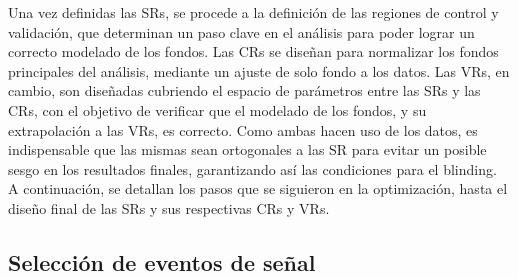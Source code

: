 Una vez definidas las SRs, se procede a la definición de las regiones de control y validación, que determinan un paso clave en el análisis para poder lograr un correcto modelado de los fondos. Las CRs se diseñan para normalizar los fondos principales del análisis, mediante un ajuste de solo fondo a los datos. Las VRs, en cambio, son diseñadas cubriendo el espacio de parámetros entre las SRs y las CRs, con el objetivo de verificar que el modelado de los fondos, y su extrapolación a las VRs, es correcto. Como ambas hacen uso de los datos, es indispensable que las mismas sean ortogonales a las SR para evitar un posible sesgo en los resultados finales, garantizando así las condiciones para el blinding.
A continuación, se detallan los pasos que se siguieron en la optimización, hasta el diseño final de las SRs y sus respectivas CRs y VRs.

\subsection{Selección de eventos de señal}\label{sec:sig_selection}

